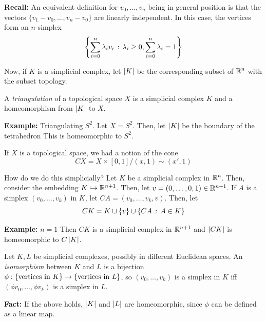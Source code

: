 

\textbf{Recall:} An equivalent definition for $v_0, \ldots, v_n$ being in general position is that the vectors $\{v_1 - v_0, \ldots, v_n - v_0\}$ are linearly independent. In this case, the vertices form an $n$-simplex
\[ \left\{\sum_{i = 0}^{n} \lambda_iv_i \col \lambda_i \geq 0, \sum_{i = 0}^{n} \lambda_i = 1\right\} \]

Now, if $K$ is a simplicial complex, let $\abs{K}$ be the corresponding subset of $\R^n$ with the subset topology.

\begin{definition}
    A \emph{triangulation} of a topological space $X$ is a simplicial complex $K$ and a homeomorphism from $\abs{K}$ to $X$.
\end{definition}

\begin{example}{\textbf{Example:} Triangulating $S^2$}.
    Let $X = S^2$. Then, let $\abs{K}$ be the boundary of the tetrahedron
    This is homeomorphic to $S^2$.
\end{example}

If $X$ is a topological space, we had a notion of the cone
\[ CX = X \times [0, 1] / (x, 1) \sim (x', 1) \]

How do we do this simplicially? Let $K$ be a simplicial complex in $\R^n$. Then, consider the embedding $K \hookrightarrow \R^{n + 1}$. Then, let $v = (0, \ldots, 0, 1) \in \R^{n + 1}$. If $A$ is a simplex $(v_0, \ldots, v_k)$ in $K$, let $CA = (v_0, \ldots, v_k, v)$. Then, let
\[ CK = K \cup \{v\} \cup \{CA \col A \in K\} \]

\textbf{Example:} $n = 1$
Then $CK$ is a simplicial complex in $\R^{n + 1}$ and $\abs{CK}$ is homeomorphic to $C\abs{K}$.

\begin{definition}
    Let $K, L$ be simplicial complexes, possibly in different Euclidean spaces. An \emph{isomorphism} between $K$ and $L$ is a bijection $\phi : \{\tt{vertices in } K\} \to \{\tt{vertices in } L\}$, so $(v_0, \ldots, v_k)$ is a simplex in $K$ iff $(\phi v_0, \ldots, \phi v_k)$ is a simplex in $L$.
\end{definition}


\textbf{Fact:} If the above holds, $\abs{K}$ and $\abs{L}$ are homeomorphic, since $\phi$ can be defined as a linear map.

